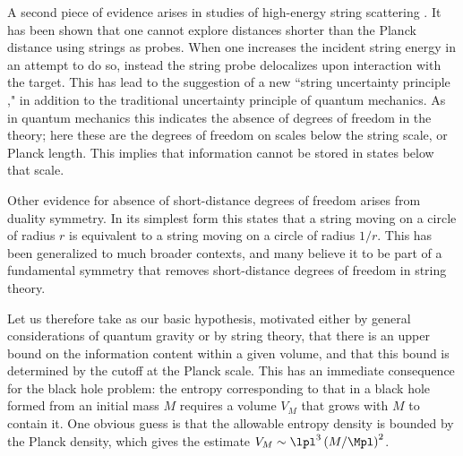 A second piece of evidence arises in studies of high-energy string
scattering .  It has been shown that  one
cannot explore distances shorter than the Planck distance using strings
as probes. When one increases the incident string energy in an
attempt to do so, instead the string probe
delocalizes upon interaction
with the target.  This has lead to the suggestion of a new ``string
uncertainty principle ," in addition to the
traditional uncertainty principle of quantum mechanics.  As in
quantum mechanics this indicates the absence of degrees of freedom in
the theory; here these are the degrees of freedom on scales below the
string scale, or
Planck length.  This implies that information cannot be stored in
states below that scale.

Other evidence for absence of short-distance degrees of freedom
arises from duality symmetry. 	In its simplest form 
this states that
a string moving on a circle of radius $r$ is equivalent to a string
moving on a circle of radius $1/r$.  This has been generalized to
much broader contexts, and many believe it to be part of a
fundamental symmetry that removes short-distance degrees of freedom
in string theory.

Let us therefore take as our basic hypothesis, motivated either by general
considerations of quantum gravity or by string theory, that there is
an
upper bound on the information content within a given volume, and that this
bound is
determined by the cutoff at the Planck scale.
This has an immediate consequence for the black hole problem:
the entropy corresponding to that in a black hole formed from an initial
mass $M$ requires a volume $V_M$ that grows with $M$ to contain it.
One obvious guess is that the allowable
entropy density is bounded by the Planck density, which gives the estimate
$V_M\sim \lpl^3 \left(M/\Mpl\right)^2$.

